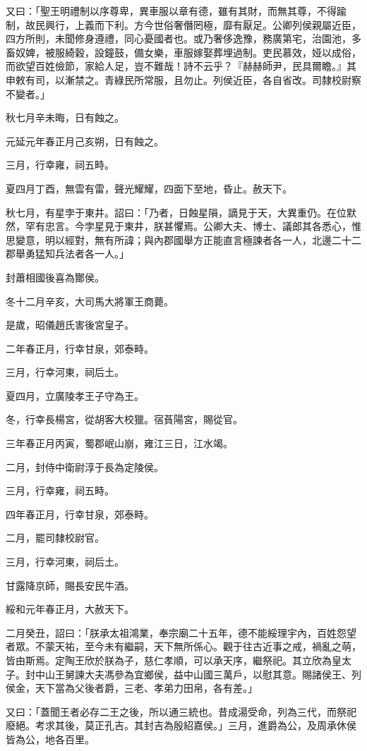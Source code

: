 \begin{pinyinscope}
又曰：「聖王明禮制以序尊卑，異車服以章有德，雖有其財，而無其尊，不得踰制，故民興行，上義而下利。方今世俗奢僭罔極，靡有厭足。公卿列侯親屬近臣，四方所則，未聞修身遵禮，同心憂國者也。或乃奢侈逸豫，務廣第宅，治園池，多畜奴婢，被服綺穀，設鐘鼓，備女樂，車服嫁娶葬埋過制。吏民慕效，娅以成俗，而欲望百姓儉節，家給人足，豈不難哉！詩不云乎？『赫赫師尹，民具爾瞻。』其申敕有司，以漸禁之。青綠民所常服，且勿止。列侯近臣，各自省改。司隸校尉察不變者。」

秋七月辛未晦，日有蝕之。

元延元年春正月己亥朔，日有蝕之。

三月，行幸雍，祠五畤。

夏四月丁酉，無雲有雷，聲光耀耀，四面下至地，昏止。赦天下。

秋七月，有星孛于東井。詔曰：「乃者，日蝕星隕，謫見于天，大異重仍。在位默然，罕有忠言。今孛星見于東井，朕甚懼焉。公卿大夫、博士、議郎其各悉心，惟思變意，明以經對，無有所諱；與內郡國舉方正能直言極諫者各一人，北邊二十二郡舉勇猛知兵法者各一人。」

封蕭相國後喜為酇侯。

冬十二月辛亥，大司馬大將軍王商薨。

是歲，昭儀趙氏害後宮皇子。

二年春正月，行幸甘泉，郊泰畤。

三月，行幸河東，祠后土。

夏四月，立廣陵孝王子守為王。

冬，行幸長楊宮，從胡客大校獵。宿萯陽宮，賜從官。

三年春正月丙寅，蜀郡岷山崩，雍江三日，江水竭。

二月，封侍中衛尉淳于長為定陵侯。

三月，行幸雍，祠五畤。

四年春正月，行幸甘泉，郊泰畤。

二月，罷司隸校尉官。

三月，行幸河東，祠后土。

甘露降京師，賜長安民牛酒。

綏和元年春正月，大赦天下。

二月癸丑，詔曰：「朕承太祖鴻業，奉宗廟二十五年，德不能綏理宇內，百姓怨望者眾。不蒙天祐，至今未有繼嗣，天下無所係心。觀于往古近事之戒，禍亂之萌，皆由斯焉。定陶王欣於朕為子，慈仁孝順，可以承天序，繼祭祀。其立欣為皇太子。封中山王舅諫大夫馮參為宜鄉侯，益中山國三萬戶，以慰其意。賜諸侯王、列侯金，天下當為父後者爵，三老、孝弟力田帛，各有差。」

又曰：「蓋聞王者必存二王之後，所以通三統也。昔成湯受命，列為三代，而祭祀廢絕。考求其後，莫正孔吉。其封吉為殷紹嘉侯。」三月，進爵為公，及周承休侯皆為公，地各百里。


\end{pinyinscope}
